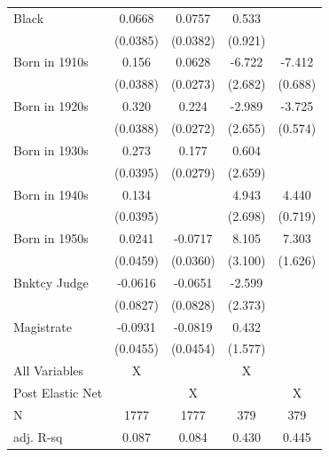 {\begin{tabular}{l*{4}{c}}
\addlinespace
Black               &      0.0668\sym{+} &      0.0757\sym{*} &       0.533        &                    \\
                    &    (0.0385)        &    (0.0382)        &     (0.921)        &                    \\
\addlinespace
Born in 1910s       &       0.156\sym{**}&      0.0628\sym{*} &      -6.722\sym{*} &      -7.412\sym{**}\\
                    &    (0.0388)        &    (0.0273)        &     (2.682)        &     (0.688)        \\
\addlinespace
Born in 1920s       &       0.320\sym{**}&       0.224\sym{**}&      -2.989        &      -3.725\sym{**}\\
                    &    (0.0388)        &    (0.0272)        &     (2.655)        &     (0.574)        \\
\addlinespace
Born in 1930s       &       0.273\sym{**}&       0.177\sym{**}&       0.604        &                    \\
                    &    (0.0395)        &    (0.0279)        &     (2.659)        &                    \\
\addlinespace
Born in 1940s       &       0.134\sym{**}&                    &       4.943\sym{+} &       4.440\sym{**}\\
                    &    (0.0395)        &                    &     (2.698)        &     (0.719)        \\
\addlinespace
Born in 1950s       &      0.0241        &     -0.0717\sym{*} &       8.105\sym{**}&       7.303\sym{**}\\
                    &    (0.0459)        &    (0.0360)        &     (3.100)        &     (1.626)        \\
\addlinespace
Bnktcy Judge        &     -0.0616        &     -0.0651        &      -2.599        &                    \\
                    &    (0.0827)        &    (0.0828)        &     (2.373)        &                    \\
\addlinespace
Magistrate          &     -0.0931\sym{*} &     -0.0819\sym{+} &       0.432        &                    \\
                    &    (0.0455)        &    (0.0454)        &     (1.577)        &                    \\
\midrule
All Variables       &           X        &                    &           X        &                    \\
Post Elastic Net    &                    &           X        &                    &           X        \\
N                   &        1777        &        1777        &         379        &         379        \\
adj. R-sq           &       0.087        &       0.084        &       0.430        &       0.445        \\
\bottomrule
\end{tabular}
}

